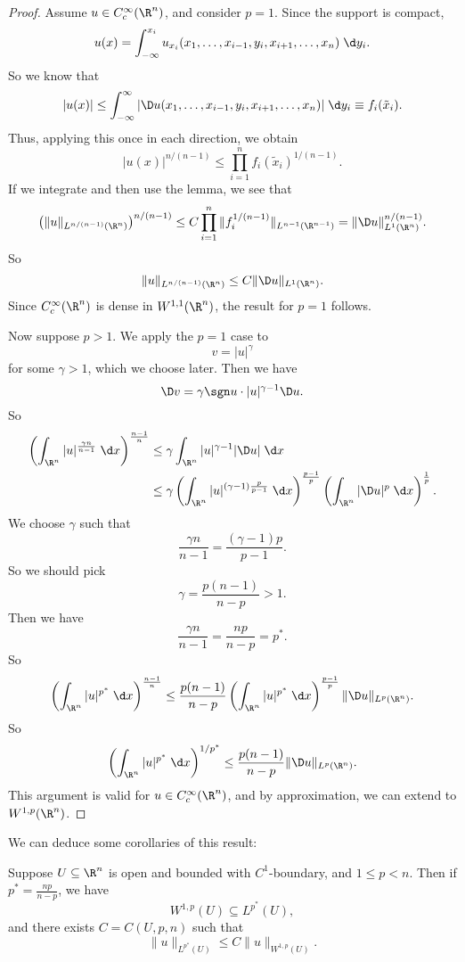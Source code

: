\documentclass[a4paper]{article}
\begin{document}
\begin{proof}
  Assume $u \in C_c^\infty(\R^n)$, and consider $p = 1$. Since the support is compact,
  \[
    u(x) = \int_{-\infty}^{x_i} u_{x_i}(x_1 ,\ldots, x_{i - 1}, y_i, x_{i + 1}, \ldots, x_n)\;\d y_i.
  \]
  So we know that
  \[
    |u(x)| \leq \int_{-\infty}^\infty |\D u(x_1, \ldots, x_{i - 1}, y_i, x_{i + 1}, \ldots, x_n)|\;\d y_i \equiv f_i(\tilde{x}_i).
  \]
  Thus, applying this once in each direction, we obtain
  \[
    |u(x)|^{n/(n - 1)} \leq \prod_{i = 1}^n f_i(\tilde{x}_i)^{1/(n - 1)}.
  \]
  If we integrate and then use the lemma, we see that
  \[
    \left(\|u\|_{L^{n/(n - 1)}(\R^n)}\right)^{n/(n - 1)} \leq C \prod_{i = 1}^n \|f_i^{1/(n - 1)}\|_{L^{n - 1}(\R^{n - 1})} = \|\D u\|_{L^1(\R^n)}^{n/(n-1)}.
  \]
  So
  \[
    \|u\|_{L^{n/(n-1)}(\R^n)} \leq C \|\D u\|_{L^1(\R^n)}.
  \]
  Since $C^\infty_c(\R^n)$ is dense in $W^{1, 1}(\R^n)$, the result for $p = 1$ follows.

  Now suppose $p > 1$. We apply the $p = 1$ case to
  \[
    v = |u|^\gamma
  \]
  for some $\gamma > 1$, which we choose later. Then we have
  \[
    \D v = \gamma \sgn u \cdot |u|^{\gamma - 1} \D u.
  \]
  So
  \begin{align*}
    \left(\int_{\R^n} |u|^{\frac{\gamma n}{n-1}} \;\d x\right)^{n - 1 \over n} &\leq \gamma \int_{\R^n} |u|^{\gamma - 1}|\D u|\;\d x\\
    &\leq \gamma \left(\int_{\R^n} |u|^{(\gamma - 1) \frac{p}{p - 1}}\;\d x\right)^{\frac{p - 1}{p}} \left(\int_{\R^n} |\D u|^p \;\d x\right)^{\frac{1}{p}}.
  \end{align*}
  We choose $\gamma$ such that
  \[
    \frac{\gamma n}{n - 1} = \frac{(\gamma - 1)p}{p - 1}.
  \]
  So we should pick
  \[
    \gamma = \frac{p(n - 1)}{n - p} > 1.
  \]
  Then we have
  \[
    \frac{\gamma n}{n - 1} = \frac{np}{n - p} = p^*.
  \]
  So
  \[
    \left(\int_{\R^n} |u|^{p^*}\;\d x\right)^{\frac{n - 1}{n}} \leq \frac{p(n - 1)}{n - p}\left(\int_{\R^n} |u|^{p^*}\;\d x \right)^{\frac{p - 1}{p}} \|\D u\|_{L^p(\R^n)}.
  \]
  So
  \[
    \left(\int_{\R^n}|u|^{p^*}\;\d x\right)^{1/p^*} \leq \frac{p(n - 1)}{n - p} \|\D u\|_{L^p(\R^n)}.
  \]
  This argument is valid for $u \in C_c^\infty(\R^n)$, and by approximation, we can extend to $W^{1, p}(\R^n)$.
\end{proof}

We can deduce some corollaries of this result:
\begin{cor}
  Suppose $U \subseteq \R^n$ is open and bounded with $C^1$-boundary, and $1 \leq p < n$. Then if $p^* = \frac{np}{n - p}$, we have
  \[
    W^{1, p}(U) \subseteq L^{p^*}(U),
  \]
  and there exists $C = C(U, p, n)$ such that
  \[
    \|u\|_{L^{p^*}(U)} \leq C\|u\|_{W^{1, p}(U)}.
  \]
\end{cor}
\end{document}
